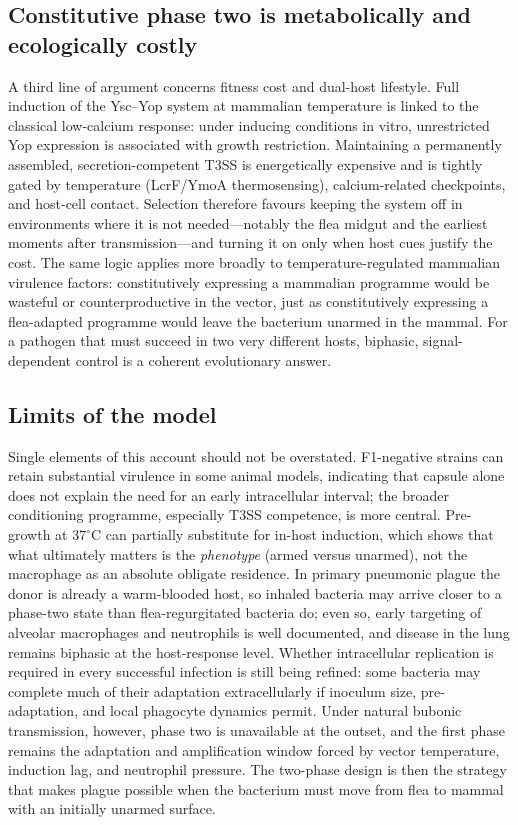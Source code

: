\documentclass[11pt,a4paper]{article}
\begin{document}
\subsection{Constitutive phase two is metabolically and ecologically costly}

A third line of argument concerns fitness cost and dual-host lifestyle. Full induction of the Ysc--Yop system at mammalian temperature is linked to the classical low-calcium response: under inducing conditions in vitro, unrestricted Yop expression is associated with growth restriction. Maintaining a permanently assembled, secretion-competent T3SS is energetically expensive and is tightly gated by temperature (LcrF/YmoA thermosensing), calcium-related checkpoints, and host-cell contact. Selection therefore favours keeping the system off in environments where it is not needed---notably the flea midgut and the earliest moments after transmission---and turning it on only when host cues justify the cost. The same logic applies more broadly to temperature-regulated mammalian virulence factors: constitutively expressing a mammalian programme would be wasteful or counterproductive in the vector, just as constitutively expressing a flea-adapted programme would leave the bacterium unarmed in the mammal. For a pathogen that must succeed in two very different hosts, biphasic, signal-dependent control is a coherent evolutionary answer.

\subsection{Limits of the model}

Single elements of this account should not be overstated. F1-negative strains can retain substantial virulence in some animal models, indicating that capsule alone does not explain the need for an early intracellular interval; the broader conditioning programme, especially T3SS competence, is more central. Pre-growth at $37^\circ\mathrm{C}$ can partially substitute for in-host induction, which shows that what ultimately matters is the \emph{phenotype} (armed versus unarmed), not the macrophage as an absolute obligate residence. In primary pneumonic plague the donor is already a warm-blooded host, so inhaled bacteria may arrive closer to a phase-two state than flea-regurgitated bacteria do; even so, early targeting of alveolar macrophages and neutrophils is well documented, and disease in the lung remains biphasic at the host-response level. Whether intracellular replication is required in every successful infection is still being refined: some bacteria may complete much of their adaptation extracellularly if inoculum size, pre-adaptation, and local phagocyte dynamics permit. Under natural bubonic transmission, however, phase two is unavailable at the outset, and the first phase remains the adaptation and amplification window forced by vector temperature, induction lag, and neutrophil pressure. The two-phase design is then the strategy that makes plague possible when the bacterium must move from flea to mammal with an initially unarmed surface.
\end{document}
